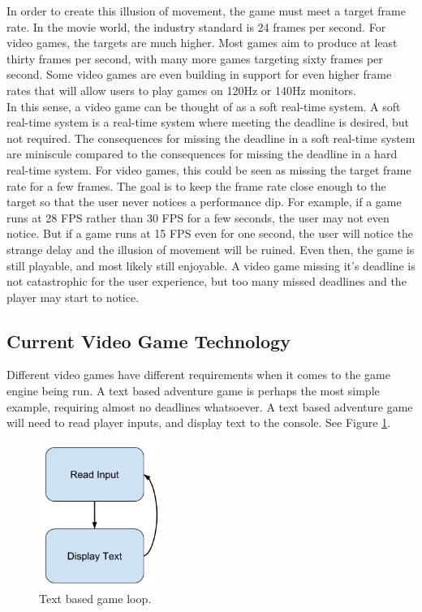 \documentclass[a4paper, 12pt]{article}
\begin{document}
        In order to create this illusion of movement, the game must meet a target frame rate. In the movie world, the industry standard is 24 frames per second. For video games, the targets are much higher. Most games aim to produce at least thirty frames per second, with many more games targeting sixty frames per second. Some video games are even building in support for even higher frame rates that will allow users to play games on 120Hz or 140Hz monitors. \\

        In this sense, a video game can be thought of as a soft real-time system. A soft real-time system is a real-time system where meeting the deadline is desired, but not required. The consequences for missing the deadline in a soft real-time system are miniscule compared to the consequences for missing the deadline in a hard real-time system. For video games, this could be seen as missing the target frame rate for a few frames. The goal is to keep the frame rate close enough to the target so that the user never notices a performance dip. For example, if a game runs at 28 FPS rather than 30 FPS for a few seconds, the user may not even notice. But if a game runs at 15 FPS even for one second, the user will notice the strange delay and the illusion of movement will be ruined. Even then, the game is still playable, and most likely still enjoyable. A video game missing it's deadline is not catastrophic for the user experience, but too many missed deadlines and the player may start to notice. \\

    \subsection{Current Video Game Technology}

        Different video games have different requirements when it comes to the game engine being run. A text based adventure game is perhaps the most simple example, requiring almost no deadlines whatsoever. A text based adventure game will need to read player inputs, and display text to the console. See Figure \ref{text_based_loop}.
        \\

        \begin{figure}[H]
            \includegraphics[width=4cm]{text_based_loop.png}
            \centering
            \caption{Text based game loop.}
            \label{text_based_loop}
        \end{figure}
\end{document}
